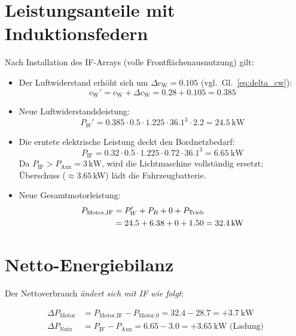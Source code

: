 ﻿\documentclass[12pt, a4paper]{report}
\theoremstyle{definition}
\theoremstyle{remark}
\newcommand{\cW}{c_{\text{W}}}
\begin{document}
\section{Leistungsanteile mit Induktionsfedern}

Nach Installation des IF-Arrays (volle Frontflächenausnutzung) gilt:

\begin{itemize}
  \item Der Luftwiderstand erhöht sich um $\Delta\cW = 0.105$ (vgl.\ Gl.~\eqref{eq:delta_cw}):
  \begin{equation}
    \cW' = \cW + \Delta\cW = 0.28 + 0.105 = 0.385
    \label{eq:cw_neu}
  \end{equation}
  \item Neue Luftwiderstandsleistung:
  \begin{equation}
    P_W' = 0.385 \cdot 0.5 \cdot 1.225 \cdot 36.1^3 \cdot 2.2 = \SI{24.5}{\kilo\watt}
    \label{eq:pw_neu}
  \end{equation}
  \item Die erntete elektrische Leistung deckt den Bordnetzbedarf:
  \begin{equation}
    P_{\text{IF}} = 0.32 \cdot 0.5 \cdot 1.225 \cdot 0.72 \cdot 36.1^3 = \SI{6.65}{\kilo\watt}
    \label{eq:p_if_130}
  \end{equation}
  Da $P_{\text{IF}} > P_{\text{Aux}} = 3\,\text{kW}$, wird die Lichtmaschine vollständig
  ersetzt; Überschuss ($\approx 3.65$\,kW) lädt die Fahrzeugbatterie.
  \item Neue Gesamtmotorleistung:
  \begin{align}
    P_{\text{Motor,IF}} &= P_W' + P_R + 0 + P_{\text{Trieb}} \notag \\
    &= 24.5 + 6.38 + 0 + 1.50 = \SI{32.4}{\kilo\watt}
    \label{eq:p_motor_if}
  \end{align}
\end{itemize}

\section{Netto-Energiebilanz}

Der Nettoverbrauch \emph{ändert sich mit IF wie folgt}:

\begin{align}
  \Delta P_{\text{Motor}} &= P_{\text{Motor,IF}} - P_{\text{Motor,0}} = 32.4 - 28.7 = +\SI{3.7}{\kilo\watt}
  \label{eq:delta_p_motor} \\
  \Delta P_{\text{Nutz}} &= P_{\text{IF}} - P_{\text{Aux}} = 6.65 - 3.0 = +\SI{3.65}{\kilo\watt}\text{ (Ladung)}
  \label{eq:delta_p_nutz}
\end{align}
\end{document}
